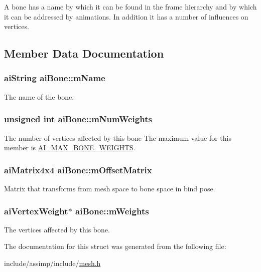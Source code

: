 A bone has a name by which it can be found in the frame hierarchy and by which it can be addressed by animations. In addition it has a number of influences on vertices. 

\subsection{Member Data Documentation}
\hypertarget{structai_bone_acfb9bfd2a2c6302181d7c3cc1bb8bbf0}{
\subsubsection[{m\-Name}]{ {\bf ai\-String} ai\-Bone\-::m\-Name}}\label{structai_bone_acfb9bfd2a2c6302181d7c3cc1bb8bbf0}


The name of the bone. 

\hypertarget{structai_bone_a87a79d42a0132753aac66397ad6f9b71}{
\subsubsection[{m\-Num\-Weights}]{\setlength{\rightskip}{0pt plus 5cm}unsigned {\bf int} ai\-Bone\-::m\-Num\-Weights}}\label{structai_bone_a87a79d42a0132753aac66397ad6f9b71}
The number of vertices affected by this bone The maximum value for this member is \hyperlink{mesh_8h_a565e88bbf36ef4957f1229609e51b7f6}{A\-I\-\_\-\-M\-A\-X\-\_\-\-B\-O\-N\-E\-\_\-\-W\-E\-I\-G\-H\-T\-S}. \hypertarget{structai_bone_a1dd6c4f24a1384c05da281692be3e78d}{
\subsubsection[{m\-Offset\-Matrix}]{ {\bf ai\-Matrix4x4} ai\-Bone\-::m\-Offset\-Matrix}}\label{structai_bone_a1dd6c4f24a1384c05da281692be3e78d}


Matrix that transforms from mesh space to bone space in bind pose. 

\hypertarget{structai_bone_ade36319714b58c03ad46aae30a2724a4}{
\subsubsection[{m\-Weights}]{ {\bf ai\-Vertex\-Weight}$\ast$ ai\-Bone\-::m\-Weights}}\label{structai_bone_ade36319714b58c03ad46aae30a2724a4}


The vertices affected by this bone. 



The documentation for this struct was generated from the following file\-:\begin{DoxyCompactItemize}
\item 
include/assimp/include/\hyperlink{mesh_8h}{mesh.\-h}\end{DoxyCompactItemize}
